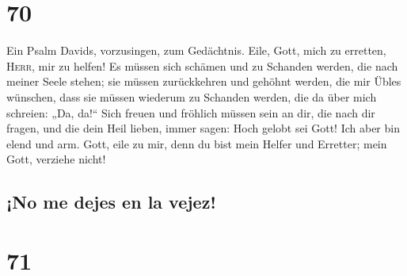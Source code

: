 \hypertarget{section-69}{%
\section{70}\label{section-69}}

 Ein Psalm Davids, vorzusingen, zum Gedächtnis.
 Eile, Gott, mich zu erretten, \textsc{Herr}, mir zu
helfen!  Es müssen sich schämen und zu Schanden werden,
die nach meiner Seele stehen; sie müssen zurückkehren und gehöhnt
werden, die mir Übles wünschen,  dass sie müssen wiederum
zu Schanden werden, die da über mich schreien: „Da, da!{}``
 Sich freuen und fröhlich müssen sein an dir, die nach dir
fragen, und die dein Heil lieben, immer sagen: Hoch gelobt sei Gott!
 Ich aber bin elend und arm. Gott, eile zu mir, denn du
bist mein Helfer und Erretter; mein Gott, verziehe nicht!

\hypertarget{no-me-dejes-en-la-vejez}{%
\subsection{¡No me dejes en la vejez!}\label{no-me-dejes-en-la-vejez}}

\hypertarget{section-70}{%
\section{71}\label{section-70}}

